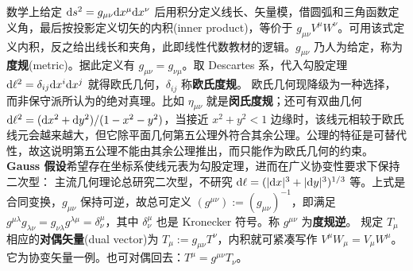 数学上给定 $\dd s^2=g_{\mu\nu}\dd x^\mu\dd x^\nu$ 后用积分定义线长、矢量模，借圆弧和三角函数定义角，最后按投影定义切矢的内积(inner product)，等价于 $g_{\mu\nu}V^\mu W^\nu$。可用该式定义内积，反之给出线长和夹角，此即线性代数教材的逻辑。$g_{\mu\nu}$ 乃人为给定，称为\textbf{度规}(metric)。据此定义有 $g_{\mu\nu}=g_{\nu\mu}$。取 Descartes 系，代入勾股定理 $\dd\ell^2=\delta_{ij}\dd x^i\dd x^j$ 就得欧氏几何，$\delta_{ij}$ 称\textbf{欧氏度规}。
欧氏几何现降级为一种选择，而非保守派所认为的绝对真理。比如 ${\eta}_{\mu\nu}$ 就是\textbf{闵氏度规}；还可有双曲几何 $\dd\ell^2=(\dd x^2+\dd y^2)/(1-x^2-y^2)$，当接近 $x^2+y^2<1$ 边缘时，该线元相较于欧氏线元会越来越大，但它除平面几何第五公理外符合其余公理。公理的特征是可替代性，故这说明第五公理不能由其余公理推出，而只能作为欧氏几何的约束。\textbf{Gauss 假设}希望存在坐标系使线元表为勾股定理，进而在广义协变性要求下保持二次型：
主流几何理论总研究二次型，不研究 $\dd\ell=(|\dd x|^3+|\dd y|^3)^{1/3}$ 等。上式是合同变换，$g_{\mu\nu}$ 保持可逆，故总可定义 $(g^{\mu\nu}):=(g_{\mu\nu})^{-1}$，即满足 $g^{\mu \lambda} g_{\lambda\nu}=g_{\nu\lambda}g^{\lambda\mu}=\delta^\mu_\nu$，其中 $\delta^\mu_\nu$ 也是 Kronecker 符号。称 $g^{\mu\nu}$ 为\textbf{度规逆}。
规定 $T_\mu$ 相应的\textbf{对偶矢量}(dual vector)为 $T_\mu:=g_{\mu\nu}T^\nu$，内积就可紧凑写作 $V^\mu W_\mu=V_\mu W^\mu$。它为协变矢量一例。也可对偶回去：$T^\mu=g^{\mu\nu}T_\nu$。

